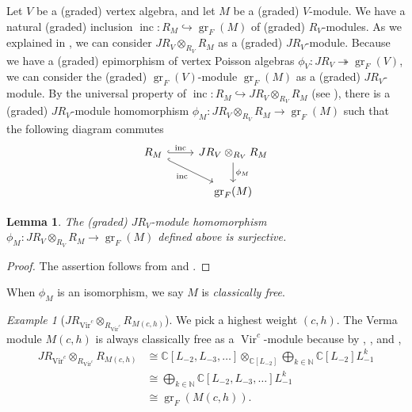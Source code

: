 \documentclass[a4paper, 12pt, reqno]{amsart}
\newtheorem{lemma}[theorem]{Lemma}
\theoremstyle{remark}
\newtheorem{example}[theorem]{Example}
\DeclareMathOperator{\Vir}{Vir}
\DeclareMathOperator{\gr}{gr}
\DeclareMathOperator{\inc}{inc}
\begin{document}
Let $V$ be a (graded) vertex algebra, and let $M$ be a (graded) $V$-module.
We have a natural (graded) inclusion $\inc: R_M \hookrightarrow \gr_F(M)$ of (graded) $R_V$-modules.
As we explained in , we can consider $JR_V \otimes_{R_V} R_M$ as a (graded) $JR_V$-module.
Because we have a (graded) epimorphism of vertex Poisson algebras $\phi_V: JR_V \twoheadrightarrow \gr_F(V)$, we can consider the (graded) $\gr_F(V)$-module $\gr_F(M)$ as a (graded) $JR_V$-module.
By the universal property of $\inc: R_M \hookrightarrow JR_V \otimes_{R_V} R_M$ (see ), there is a (graded) $JR_V$-module homomorphism $\phi_M: JR_V \otimes_{R_V} R_M \to \gr_F(M)$ such that the following diagram commutes
\begin{equation*}
  \begin{tikzcd}
    R_M \arrow[r, "\inc", hook] \arrow[rd, "\inc"', hook] & JR_V \otimes_{R_V} R_M \arrow[d, "\phi_M"] \\
    & \gr_F(M)
  \end{tikzcd}
\end{equation*}

\begin{lemma}
  \label{lmm:27}
  The (graded) $JR_V$-module homomorphism $\phi_M: JR_V \otimes_{R_V} R_M \to \gr_F(M)$ defined above is surjective.
\end{lemma}

\begin{proof}
  The assertion follows from  and .
\end{proof}

When $\phi_M$ is an isomorphism, we say $M$ is \emph{classically free}.

\begin{example}[$JR_{\Vir^c} \otimes_{R_{\Vir^c}} R_{M(c, h)}$]
  \label{exa:22}
  We pick a highest weight $(c, h)$.
  The Verma module $M(c, h)$ is always classically free as a $\Vir^c$-module because by , ,  and ,
  \begin{align*}
    JR_{\Vir^c} \otimes_{R_{\Vir^c}} R_{M(c, h)} &\cong \mathbb{C}[L_{-2}, L_{-3}, \dots] \otimes_{\mathbb{C}[L_{-2}]} \bigoplus_{k \in \mathbb{N}}\mathbb{C}[L_{-2}]L_{-1}^k \\
                                                 &\cong \bigoplus_{k \in \mathbb{N}}\mathbb{C}[L_{-2}, L_{-3}, \dots]L_{-1}^k \\
                                                 &\cong \gr_F(M(c, h)).
  \end{align*}
\end{example}
\end{document}
